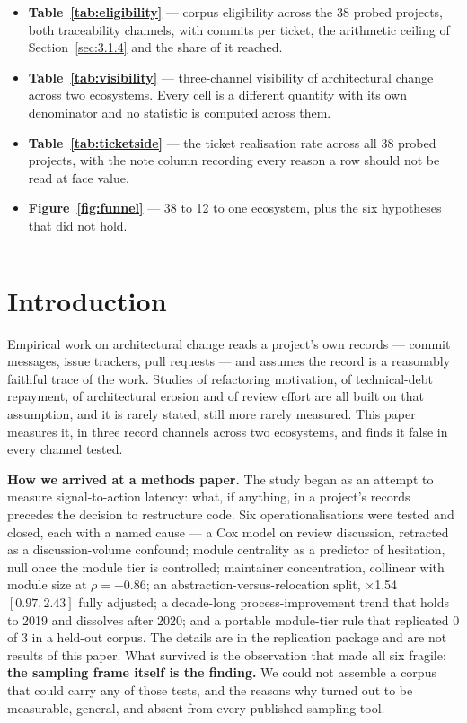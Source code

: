 \documentclass[11pt,a4paper]{article}
\begin{document}
\begin{itemize}\setlength{\itemsep}{2pt}
\item \textbf{Table~\ref{tab:eligibility}} --- corpus eligibility across the 38
probed projects, both traceability channels, with commits per ticket, the
arithmetic ceiling of Section~\ref{sec:3.1.4} and the share of it reached.
\item \textbf{Table~\ref{tab:visibility}} --- three-channel visibility of
architectural change across two ecosystems. Every cell is a different quantity
with its own denominator and no statistic is computed across them.
\item \textbf{Table~\ref{tab:ticketside}} --- the ticket realisation rate across
all 38 probed projects, with the note column recording every reason a row should
not be read at face value.
\item \textbf{Figure~\ref{fig:funnel}} --- 38 to 12 to one ecosystem, plus the six hypotheses that did not hold.
\end{itemize}

\medskip\hrule


\section{Introduction}
\label{sec:1}

Empirical work on architectural change reads a project's own records --- commit messages, issue trackers, pull requests --- and assumes the record is a reasonably faithful trace of the work. Studies of refactoring motivation, of technical-debt repayment, of architectural erosion and of review effort are all built on that assumption, and it is rarely stated, still more rarely measured. This paper measures it, in three record channels across two ecosystems, and finds it false in every channel tested.

\textbf{How we arrived at a methods paper.} The study began as an attempt to measure signal-to-action latency: what, if anything, in a project's records precedes the decision to restructure code. Six operationalisations were tested and closed, each with a named cause --- a Cox model on review discussion, retracted as a discussion-volume confound; module centrality as a predictor of hesitation, null once the module tier is controlled; maintainer concentration, collinear with module size at $\rho = -0.86$; an abstraction-versus-relocation split, $\times$1.54 $[0.97, 2.43]$ fully adjusted; a decade-long process-improvement trend that holds to 2019 and dissolves after 2020; and a portable module-tier rule that replicated 0 of 3 in a held-out corpus. The details are in the replication package and are not results of this paper. What survived is the observation that made all six fragile: \textbf{the sampling frame itself is the finding.} We could not assemble a corpus that could carry any of those tests, and the reasons why turned out to be measurable, general, and absent from every published sampling tool.
\end{document}
